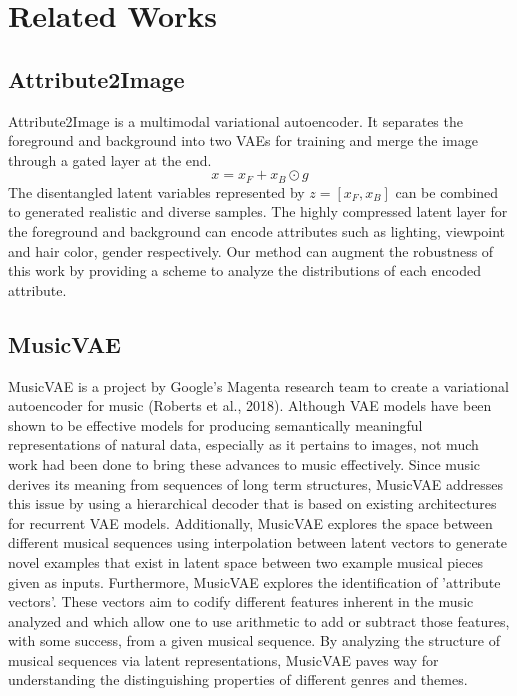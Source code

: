 \documentclass{article}
\begin{document}
\section{Related Works}
\subsection{Attribute2Image}

Attribute2Image is a multimodal variational autoencoder. It separates the foreground and background into two VAEs for training and merge the image through a gated layer at the end. 
\begin{equation} 
x=x_F + x_B \odot g
\end{equation}
The disentangled latent variables represented by $z=[x_F, x_B]$ can be combined to generated realistic and diverse samples. The highly compressed latent layer for the foreground and background can encode attributes such as lighting, viewpoint and hair color, gender respectively. Our method can augment the robustness of this work by providing a scheme to analyze the distributions of each encoded attribute.

\subsection{MusicVAE}

MusicVAE is a project by Google's Magenta research team to create a variational autoencoder for music (Roberts et al., 2018). Although VAE models have been shown to be effective models for producing semantically meaningful representations of natural data, especially as it pertains to images, not much work had been done to bring these advances to music effectively. Since music derives its meaning from sequences of long term structures, MusicVAE addresses this issue by using a hierarchical decoder that is based on existing architectures for recurrent VAE models. Additionally, MusicVAE explores the space between different musical sequences using interpolation between latent vectors to generate novel examples that exist in latent space between two example musical pieces given as inputs. Furthermore, MusicVAE explores the identification of 'attribute vectors'. These vectors aim to codify different features inherent in the music analyzed and which allow one to use arithmetic to add or subtract those features, with some success, from a given musical sequence. By analyzing the structure of musical sequences via latent representations, MusicVAE paves way for understanding the distinguishing properties of different genres and themes.
\end{document}
